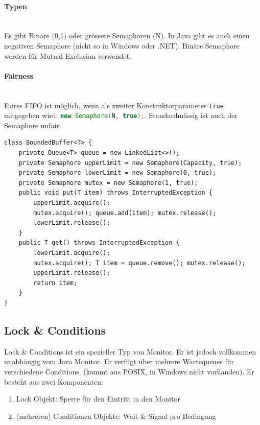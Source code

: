 \paragraph{Typen} \hfill \\
Es gibt Binäre (0,1) oder grössere Semaphoren (N). In Java gibt es auch einen negativen Semaphore (nicht so in Windows oder .NET). Binäre Semaphore werden für Mutual Exclusion verwendet.

\paragraph{Fairness} \hfill \\
Faires FIFO ist möglich, wenn als zweiter Konstruktorparameter \lstinline|true| mitgegeben wird: \lstinline[language=java]|new Semaphore(N, true);|. Standardmässig ist auch der Semaphore unfair.

\begin{lstlisting}
class BoundedBuffer<T> {
	private Queue<T> queue = new LinkedList<>();
	private Semaphore upperLimit = new Semaphore(Capacity, true);
	private Semaphore lowerLimit = new Semaphore(0, true);
	private Semaphore mutex = new Semaphore(1, true);
	public void put(T item) throws InterruptedException {
		upperLimit.acquire();
		mutex.acquire(); queue.add(item); mutex.release();
		lowerLimit.release();
	}
	public T get() throws InterruptedException {
		lowerLimit.acquire();
		mutex.acquire(); T item = queue.remove(); mutex.release();
		upperLimit.release();
		return item;
	}
}
\end{lstlisting}

\clearpage

\subsection{Lock \& Conditions}
Lock \& Conditions ist ein spezieller Typ von Monitor. Er ist jedoch vollkommen unabhängig vom Java Monitor. Er verfügt über mehrere Wartequeues für verschiedene Conditions. (kommt aus POSIX, in Windows nicht vorhanden). Er besteht aus zwei Komponenten:

\begin{enumerate}
	\item Lock Objekt: Sperre für den Eintritt in den Monitor
	\item (mehreren) Conditionen Objekte: Wait \& Signal pro Bedingung
\end{enumerate}


